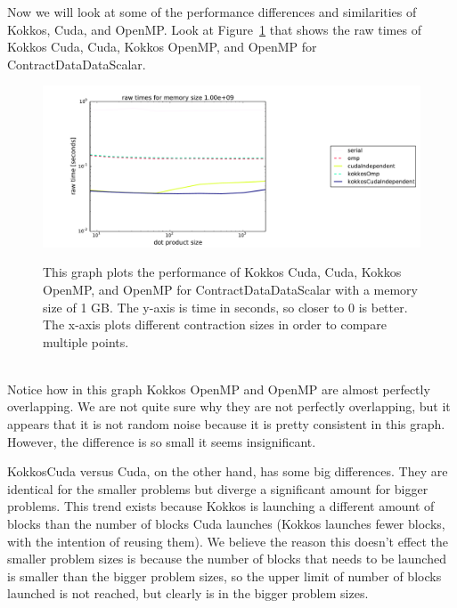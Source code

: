 Now we will look at some of the performance differences and similarities of
Kokkos, Cuda, and OpenMP. Look at Figure~\ref{fig:ContractDataDataScalar Kokkos performance comparison} that shows the raw times of Kokkos
Cuda, Cuda, Kokkos OpenMP, and OpenMP for ContractDataDataScalar. \\
\begin{figure}[!ht]
{\includegraphics[scale=.4]{CDDS_RawTimes_2d_largestSize_Comparison.pdf}}
\caption[ContractDataDataScalar Kokkos performance comparison]{This graph plots the performance of Kokkos Cuda, Cuda, Kokkos OpenMP,
and OpenMP for ContractDataDataScalar with a memory size of 1 GB. 
The y-axis is time in
seconds, so closer to 0 is better. The x-axis plots different contraction sizes
in order to compare multiple points.}
\label{fig:ContractDataDataScalar Kokkos performance comparison}
\end{figure} \\
Notice how in this graph Kokkos OpenMP and OpenMP are almost perfectly
overlapping. We are not quite sure why they are not perfectly
overlapping, but it appears that it is not random noise because it is pretty
consistent in this graph. However, the difference is so small it seems
insignificant. 

KokkosCuda versus Cuda, on the other hand, has some big differences. They are
identical for the smaller problems but diverge a significant amount for bigger
problems. This trend exists because Kokkos is launching a different amount of blocks than the number of blocks Cuda launches 
(Kokkos launches fewer blocks, with the intention of reusing them).
We believe the reason this doesn't effect the smaller problem sizes is because
the number of blocks that needs to be launched is smaller than the bigger problem sizes, so
the upper limit of number of blocks launched is not reached, but clearly is in the bigger problem sizes. 

